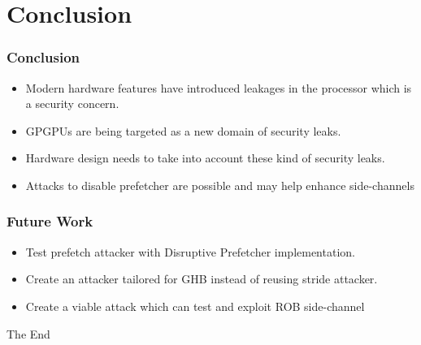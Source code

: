 \documentclass[10pt]{beamer}
\begin{document}
\section{Conclusion}
\begin{frame}
\frametitle{Conclusion}
\begin{itemize}
    \item Modern hardware features have introduced leakages in the processor which is a security concern.
    \item GPGPUs are being targeted as a new domain of security leaks.
    \item Hardware design needs to take into account these kind of security leaks.
    \item Attacks to disable prefetcher are possible and may help enhance side-channels
\end{itemize}
\end{frame}

\begin{frame}
\frametitle{Future Work}
\begin{itemize}
        \item Test prefetch attacker with Disruptive Prefetcher implementation.
        \item Create an attacker tailored for GHB instead of reusing stride attacker.
        \item Create a viable attack which can test and exploit ROB side-channel
\end{itemize}
\end{frame}

\begin{frame}
\Huge{\centerline{The End}}
\end{frame}
\end{document}
